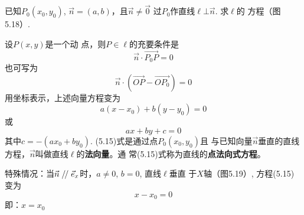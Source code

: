 已知$P_0(x_0,y_0)$, $\vec{n}=(a,b)$，且$\vec{n}\ne \vec{0}$
过$P_0$作直线$\ell\bot \vec{n}$. 求$\ell$的
方程（图5.18）.
\begin{figure}[htp]
    \centering
{}
    \caption{}
\end{figure}

设$P(x,y)$是一个动
点，则$P\in\ell$的充要条件是
\[\vec{n}\cdot \Vec{P_0P}=0\]
也可写为
\[\vec{n}\cdot (\Vec{OP}-\Vec{OP_0})=0\]
用坐标表示，上述向量方程变为
\begin{equation}
   a(x-x_0)+b(y-y_0)=0 
\end{equation}
或
\[ax+by+c=0\]
其中$c=-(ax_0+by_0)$. (5.15)式是通过点$P_0(x_0,y_0)$且
与已知向量$\vec{n}$垂直的直线方程，$\vec{n}$叫做直线$\ell$的\textbf{法向量}。通
常(5.15)式称为直线的\textbf{点法向式方程}。

特殊情况：当$\vec{n}\mathrel{/\mskip-2.5mu/} \vec{e}_x$时，$a\ne 0$, $b=0$, 直线$\ell$垂直
于$X$轴（图5.19）, 方程(5.15)变为
\[x-x_0=0\]
即：$x=x_0$


